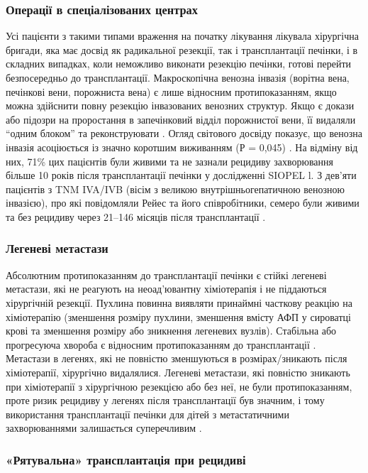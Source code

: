 \subsubsection{Операції в спеціалізованих центрах} 

Усі пацієнти з такими типами враження на початку лікування лікувала хірургічна бригади, яка має досвід як радикальної резекції, так і трансплантації печінки, і в складних випадках, коли неможливо виконати резекцію печінки, готові перейти безпосередньо до трансплантації. 
Макроскопічна венозна інвазія (ворітна вена, печінкові вени, порожниста вена) є лише відносним протипоказанням, якщо можна здійснити повну резекцію інвазованих венозних структур. Якщо є докази або підозри на проростання в запечінковий відділ порожнистої вени, її видаляли “одним блоком” та реконструювати \cite{pmid20345611}. Огляд світового досвіду показує, що венозна інвазія асоціюється із значно коротшим виживанням (Р = 0,045) \cite{pmid10466608}. На відміну від них, 71\% цих пацієнтів були живими та не зазнали рецидиву захворювання більше 10 років після трансплантації печінки у дослідженні SIOPEL l. З дев'яти пацієнтів з TNM IVA/IVB (вісім з великою внутрішньогепатичною венозною інвазією), про які повідомляли Рейес та його співробітники, семеро були живими та без рецидиву через 21–146 місяців після трансплантації \cite{pmid21509775}.

\subsubsection{Легеневі метастази} 
Абсолютним протипоказанням до трансплантації печінки є стійкі легеневі метастази, які не реагують на неоад’ювантну хіміотерапія і не піддаються хірургічній резекції. Пухлина повинна виявляти принаймні часткову реакцію на хіміотерапію (зменшення розміру пухлини, зменшення вмісту АФП у сироватці крові та зменшення розміру або зникнення легеневих вузлів). Стабільна або прогресуюча хвороба є відносним протипоказанням до трансплантації \cite{pmid16045186}. Метастази в легенях, які не повністю зменшуються в розмірах/зникають після хіміотерапії, хірургічно видалялися. Легеневі метастази, які повністю зникають при хіміотерапії з хірургічною резекцією або без неї, не були протипоказанням, проте ризик рецидиву у легенях після трансплантації був значним, і тому використання трансплантації печінки для дітей з метастатичними захворюваннями залишається суперечливим \cite{pmid24852330}.

\subsubsection{«Рятувальна» трансплантація при рецидиві}

